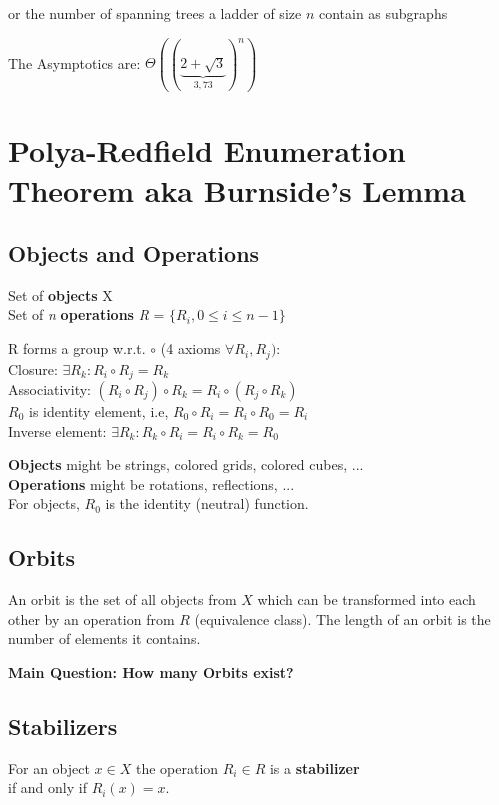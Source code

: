 \documentclass[12pt,onecolumn%
]{scrartcl}
\newcommand{\newsection}[1]{
\cleardoublepage
\section{#1}
}
\begin{document}
{or the number of spanning trees a ladder of size $n$ contain as subgraphs}

The Asymptotics are: $\Theta((\underbrace{2+\sqrt{3}}_{3,73})^n)$

\newsection{Polya-Redfield Enumeration Theorem
aka Burnside's Lemma}

\subsection{Objects and Operations}

Set of \textbf{objects} X \\
Set of \textit{n} \textbf{operations} \textit{R} = $\{R_{i},0 \leq i \leq \textit{n} - 1 \}$

R forms a group w.r.t. $\circ$ (4 axioms $\forall R_{i}, R_{j}):$  \\
Closure: $\exists R_{k} : R_{i} \circ R_{j} = R_{k}$ \\
Associativity: $(R_{i} \circ R_{j}) \circ R_{k} = R_{i} \circ (R_{j} \circ R_{k}) $ \\
$R_0$ is identity element, i.e, $R_{0} \circ R_{i} = R_{i} \circ R_{0} = R_{i}$ \\
Inverse element: $\exists R_{k} : R_{k} \circ R_{i} = R_{i} \circ R_{k} = R_{0}$ 

\textbf{Objects} might be strings, colored grids, colored cubes, ... \\
\textbf{Operations} might be rotations, reflections, ... \\
For objects, $R_{0}$ is the identity (neutral) function. \\

\subsection{Orbits}
An orbit is the set of all objects from $X$ which can be
transformed into each other by an operation from $R$
(equivalence class).
The length of an orbit is the number of elements it
contains.
\begin{center}
\textbf{Main Question: How many Orbits exist?}
\end{center}

\subsection{Stabilizers}
For an object $x \in X$ the operation $R_{i} \in R$ is a \textbf{stabilizer} \\
if and only if $R_{i}(x) = x$.
\end{document}
